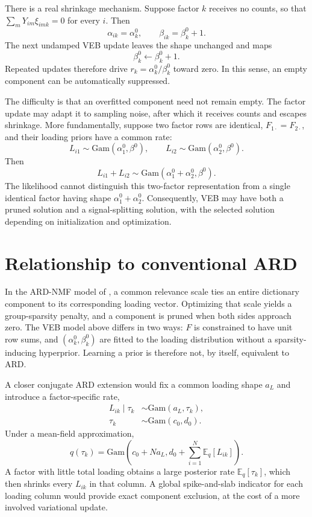 \documentclass[11pt]{article}
\newcommand{\E}{\mathbb{E}}
\newcommand{\Gam}{\mathrm{Gam}}
\begin{document}
There is a real shrinkage mechanism.  Suppose factor $k$ receives no counts,
so that $\sum_mY_{im}\xi_{imk}=0$ for every $i$.  Then
\[
  \alpha_{ik}=\alpha_k^0,
  \qquad
  \beta_{ik}=\beta_k^0+1.
\]
The next undamped VEB update leaves the shape unchanged and maps
\[
  \beta_k^0\leftarrow\beta_k^0+1.
\]
Repeated updates therefore drive $r_k=\alpha_k^0/\beta_k^0$ toward zero.  In
this sense, an empty component can be automatically suppressed.

The difficulty is that an overfitted component need not remain empty.  The
factor update may adapt it to sampling noise, after which it receives counts
and escapes shrinkage.  More fundamentally, suppose two factor rows are
identical, $F_{1\cdot}=F_{2\cdot}$, and their loading priors have a common rate:
\[
  L_{i1}\sim\Gam(\alpha_1^0,\beta^0),
  \qquad
  L_{i2}\sim\Gam(\alpha_2^0,\beta^0).
\]
Then
\begin{equation}
  L_{i1}+L_{i2}
  \sim
  \Gam(\alpha_1^0+\alpha_2^0,\beta^0).
  \label{eq:gamma-splitting}
\end{equation}
The likelihood cannot distinguish this two-factor representation from a
single identical factor having shape $\alpha_1^0+\alpha_2^0$.  Consequently,
VEB may have both a pruned solution and a signal-splitting solution, with the
selected solution depending on initialization and optimization.


\section{Relationship to conventional ARD}

In the ARD-NMF model of \cite{tan2013ard}, a common relevance scale ties an
entire dictionary component to its corresponding loading vector.  Optimizing
that scale yields a group-sparsity penalty, and a component is pruned when both
sides approach zero.  The VEB model above differs in two ways: $F$ is
constrained to have unit row sums, and $(\alpha_k^0,\beta_k^0)$ are fitted to
the loading distribution without a sparsity-inducing hyperprior.  Learning a
prior is therefore not, by itself, equivalent to ARD.

A closer conjugate ARD extension would fix a common loading shape $a_L$ and
introduce a factor-specific rate,
\begin{align}
  L_{ik}\mid\tau_k
  &\sim\Gam(a_L,\tau_k),\\
  \tau_k
  &\sim\Gam(c_0,d_0).
\end{align}
Under a mean-field approximation,
\begin{equation}
  q(\tau_k)
  =
  \Gam\!\left(
    c_0+Na_L,
    d_0+\sum_{i=1}^N\E_q[L_{ik}]
  \right).
  \label{eq:hierarchical-ard-update}
\end{equation}
A factor with little total loading obtains a large posterior rate
$\E_q[\tau_k]$, which then shrinks every $L_{ik}$ in that column.  A global
spike-and-slab indicator for each loading column would provide exact component
exclusion, at the cost of a more involved variational update.
\end{document}
